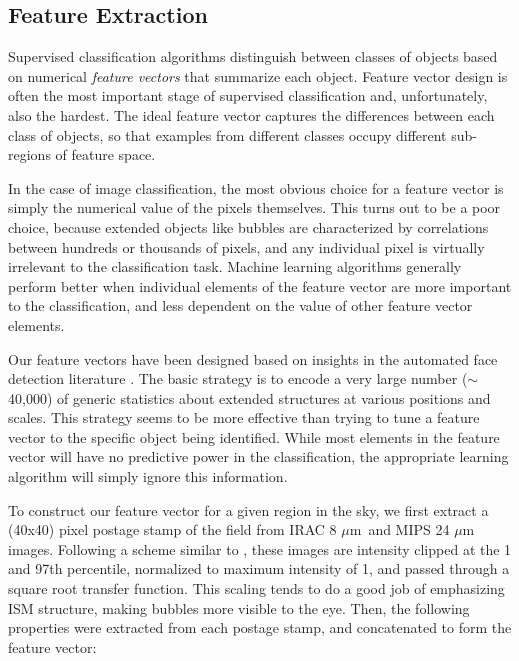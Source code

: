 \documentclass[preprint]{aastex}
\newcommand{\um}[0]{$\mu$m}
\begin{document}
\subsection{Feature Extraction}
\label{sec:method_feature_extraction}
Supervised classification algorithms distinguish between classes of objects based on numerical \textit{feature vectors} that summarize each object. Feature vector design is often the most important stage of supervised classification and, unfortunately, also the hardest. The ideal feature vector captures the differences between each class of objects, so that examples from different classes occupy different sub-regions of feature space. 

In the case of image classification, the most obvious choice for a feature vector is simply the numerical value of the pixels themselves. This turns out to be a poor choice, because extended objects like bubbles are characterized by correlations between hundreds or thousands of pixels, and any individual pixel is virtually irrelevant to the classification task. Machine learning algorithms generally perform better when individual elements of the feature vector are more important to the classification, and less dependent on the value of other feature vector elements.

Our feature vectors have been designed based on insights in the automated face detection literature \citep{ViolaJones}.  The basic strategy is to encode a very large number ($\sim$40,000) of generic statistics about extended structures at various positions and scales. This strategy seems to be more effective than trying to tune a feature vector to the specific object being identified. While most elements in the feature vector will have no predictive power in the classification, the appropriate learning algorithm will simply ignore this information.

To construct our feature vector for a given region in the sky, we first extract a (40x40) pixel postage stamp of the field from IRAC 8 \um\, and MIPS 24 \um\, images. Following a scheme similar to \cite{Simpson12}, these images are intensity clipped at the 1 and 97th percentile, normalized to maximum intensity of 1, and passed through a square root transfer function. This scaling tends to do a good job of emphasizing ISM structure, making bubbles more visible to the eye. Then, the following properties were extracted from each postage stamp, and concatenated to form the feature vector:
\end{document}

